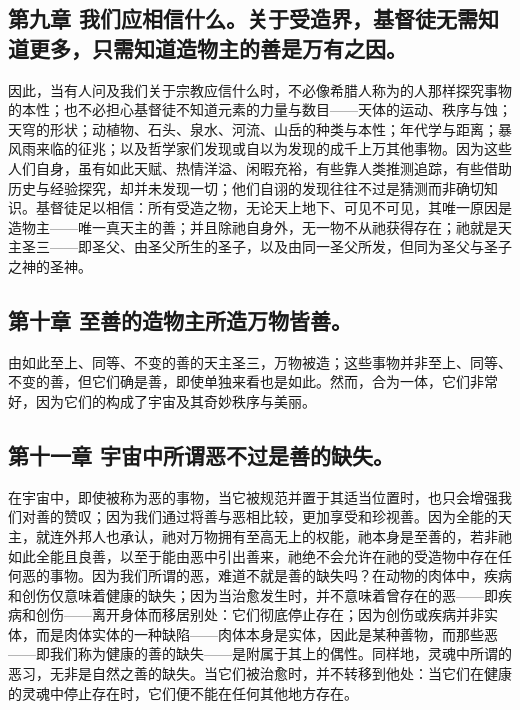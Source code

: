 \subsection{第九章 我们应相信什么。关于受造界，基督徒无需知道更多，只需知道造物主的善是万有之因。}

因此，当有人问及我们关于宗教应信什么时，不必像希腊人称为的人那样探究事物的本性；也不必担心基督徒不知道元素的力量与数目——天体的运动、秩序与蚀；天穹的形状；动植物、石头、泉水、河流、山岳的种类与本性；年代学与距离；暴风雨来临的征兆；以及哲学家们发现或自以为发现的成千上万其他事物。因为这些人们自身，虽有如此天赋、热情洋溢、闲暇充裕，有些靠人类推测追踪，有些借助历史与经验探究，却并未发现一切；他们自诩的发现往往不过是猜测而非确切知识。基督徒足以相信：所有受造之物，无论天上地下、可见不可见，其唯一原因是造物主——唯一真天主的善；并且除祂自身外，无一物不从祂获得存在；祂就是天主圣三——即圣父、由圣父所生的圣子，以及由同一圣父所发，但同为圣父与圣子之神的圣神。\par


\subsection{第十章 至善的造物主所造万物皆善。}

由如此至上、同等、不变的善的天主圣三，万物被造；这些事物并非至上、同等、不变的善，但它们确是善，即使单独来看也是如此。然而，合为一体，它们非常好，因为它们的构成了宇宙及其奇妙秩序与美丽。\par


\subsection{第十一章 宇宙中所谓恶不过是善的缺失。}

在宇宙中，即使被称为恶的事物，当它被规范并置于其适当位置时，也只会增强我们对善的赞叹；因为我们通过将善与恶相比较，更加享受和珍视善。因为全能的天主，就连外邦人也承认，祂对万物拥有至高无上的权能，祂本身是至善的，若非祂如此全能且良善，以至于能由恶中引出善来，祂绝不会允许在祂的受造物中存在任何恶的事物。因为我们所谓的恶，难道不就是善的缺失吗？在动物的肉体中，疾病和创伤仅意味着健康的缺失；因为当治愈发生时，并不意味着曾存在的恶——即疾病和创伤——离开身体而移居别处：它们彻底停止存在；因为创伤或疾病并非实体，而是肉体实体的一种缺陷——肉体本身是实体，因此是某种善物，而那些恶——即我们称为健康的善的缺失——是附属于其上的偶性。同样地，灵魂中所谓的恶习，无非是自然之善的缺失。当它们被治愈时，并不转移到他处：当它们在健康的灵魂中停止存在时，它们便不能在任何其他地方存在。\par


